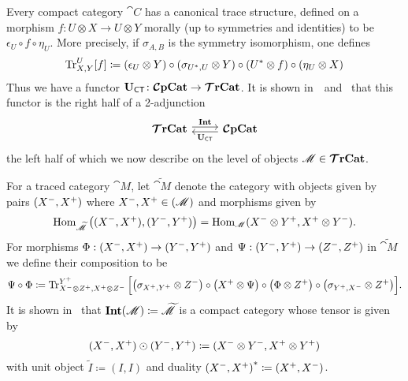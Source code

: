 \documentclass[11pt,oneside,article]{memoir}
\begin{document}
Every compact category $\cat{C}$ has a canonical trace structure, defined on a morphism $f\colon
U\otimes X\to U\otimes Y$ morally (up to symmetries and identities) to be $\epsilon_U\circ f\circ \eta_U$. More precisely, if
$\sigma_{A,B}$ is the symmetry isomorphism, one defines
\begin{equation*}
   \operatorname{Tr}^U_{X,Y}[f]\coloneqq(\epsilon_U\otimes Y)\circ (\sigma_{U^*,U}\otimes Y)\circ (U^*\otimes f)\circ (\eta_U\otimes X)
\end{equation*}
Thus we have a functor $\mathbf{U}_{\mathsf{CT}}\colon\bm{\mathcal{C}}\mathbf{pCat}\to\bm{\mathcal{T}}\mathbf{rCat}$. It is shown in~\cite{JoyalStreetVerity}~and~\cite{HK} that
this functor is the right half of a 2-adjunction
\begin{equation}\label{dia:traced_compact_adjunction}
\begin{tikzcd}
   \TTrCat\arrow[r,shift left=.5ex, "\Int"]&\CCompCat\arrow[l,shift left=.5ex,"\UCT"]
\end{tikzcd}
\end{equation}
the left half of which we now describe on the level of objects $\mathscr{M}\in\bm{\mathcal{T}}\mathbf{rCat}$.

For a traced category $\cat{M}$, let $\widetilde{\cat{M}}$ denote the category with
objects given by pairs $(X^-,X^+)$ where $X^-,X^+\in(\mathscr{M})$ and morphisms
given by
\[
   \operatorname{Hom}_{\widetilde{\mathscr{M}}}\big((X^-,X^+),(Y^-,Y^+)\big)=\operatorname{Hom}_{\mathscr{M}}(X^-\otimes Y^+,X^+\otimes Y^-).
\]
For morphisms $\Phi:(X^-,X^+)\to(Y^-,Y^+)$ and $\Psi:(Y^-,Y^+)\to(Z^-,Z^+)$ in $\widetilde{\cat{M}}$ we define their composition to be
\[
   \Psi\circ\Phi\coloneqq\operatorname{Tr}^{Y^+}_{X^-\otimes Z^+,X^+\otimes Z^-}\Big[\big(\sigma_{X^+,Y^+}\otimes Z^-\big)\circ\big(X^+\otimes\Psi\big)\circ\big(\Phi\otimes Z^+\big)\circ\big(\sigma_{Y^+,X^-}\otimes Z^+\big)\Big].
\]
It is shown in~\cite{JoyalStreetVerity} that $\mathbf{Int}(\mathscr{M})\coloneqq\widetilde{\mathscr{M}}$ is a compact category whose tensor is given by
\[
   (X^-,X^+)\odot(Y^-,Y^+)\coloneqq(X^-\otimes Y^-,X^+\otimes Y^+)
\]
with unit object $\tilde I\coloneqq(I,I)$ and duality ${(X^-,X^+)}^*\coloneqq(X^+,X^-)$.
\end{document}
